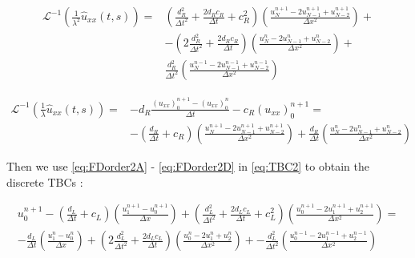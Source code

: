 \begin{equation}
     \label{eq:FDorder2C}
         \begin{aligned}
    \mathcal{L}^{-1} \left( \frac{1}{\lambda^2} \hat{u}_{xx}(t,s) \right) = & \left( \frac{d_R^2}{\Delta t^2} + \frac{2d_Rc_R}{\Delta t} + c_R^2  \right) \left(  \frac{u_{N}^{n+1} - 2u_{N-1}^{n+1} + u_{N-2}^{n+1}}{\Delta x^2} \right) + \\
    			& - \left( 2\frac{d_R^2}{\Delta t^2} + \frac{2d_Rc_R}{\Delta t}\right) \left(  \frac{u_N^{n} - 2u_{N-1}^n + u_{N-2}^{n}}{\Delta x^2} \right) + \\
    			& \frac{d_R^2}{\Delta t^2} \left(  \frac{u_N^{n-1} - 2u_{N-1}^{n-1} + u_{N-2}^{n-1}}{\Delta x^2} \right)
    \end{aligned}
 \end{equation}
     			
\begin{equation}
     \label{eq:FDorder2D}
         \begin{aligned}
    \mathcal{L}^{-1} \left( \frac{1}{\lambda} \hat{u}_{xx}(t,s) \right) = & -d_R \frac{ (u_{xx})_0^{n+1} - (u_{xx})_0^n}{\Delta t} - c_R (u_{xx})_0^{n+1} =\\
    			& -\left( \frac{d_R}{\Delta t} + c_R \right) \left( \frac{u_N^{n+1} -2 u_{N-1}^{n+1} + u_{N-2}^{n+1}}{\Delta x^2}\right) + \frac{d_R}{\Delta t}\left( \frac{u_{N}^{n} - 2u_{N-1}^{n} + u_{N-2}^n}{\Delta x^2}\right)
    \end{aligned}
\end{equation}

\normalsize

\indent Then we use \eqref{eq:FDorder2A} - \eqref{eq:FDorder2D} in \eqref{eq:TBC2} to obtain the discrete TBCs :

\small

\begin{equation}
	\begin{aligned}
    u_0^{n+1} - \left( \frac{d_L}{\Delta t} + c_L \right) \left( \frac{u_1^{n+1} - u_0^{n+1}}{\Delta x}\right) +   \left( \frac{d_L^2}{\Delta t^2} + \frac{2d_Lc_L}{\Delta t} + c_L^2  \right) \left(  \frac{u_0^{n+1} - 2u_1^{n+1} + u_2^{n+1}}{\Delta x^2} \right)  = \\
        -\frac{d_L}{\Delta t}\left( \frac{u_1^{n} - u_0^{n}}{\Delta x}\right) +  \left( 2\frac{d_L^2}{\Delta t^2} + \frac{2d_Lc_L}{\Delta t}\right) \left(  \frac{u_0^{n} - 2u_1^n + u_2^{n}}{\Delta x^2} \right) +   -  \frac{d_L^2}{\Delta t^2} \left(  \frac{u_0^{n-1} - 2u_1^{n-1} + u_2^{n-1}}{\Delta x^2} \right)
   \end{aligned}
\end{equation} 

